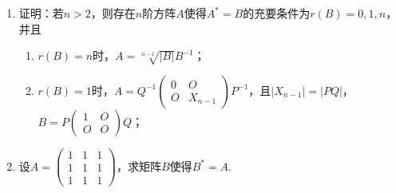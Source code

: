 \begin{enumerate}
\begin{enumerate}[label=(\arabic*)]
        \item 证明：若$n > 2$，则存在$n$阶方阵$A$使得$A^*=B$的充要条件为$r(B)=0,1,n$，并且
        \begin{enumerate}
            \item $r(B)=n$时，$A=\sqrt[n-1]{|B|}B^{-1}$；
            \item $r(B)=1$时，$A=Q^{-1}\begin{pmatrix}
                0 & O \\ O & X_{n-1}
            \end{pmatrix}P^{-1}$，且$|X_{n-1}|=|PQ|$，$B=P\begin{pmatrix}
                1 & O \\ O & O
            \end{pmatrix}Q$；
        \end{enumerate}
        \item 设$A=\begin{pmatrix}
            1 & 1 & 1 \\ 1 & 1 & 1 \\ 1 & 1 & 1
        \end{pmatrix}$，求矩阵$B$使得$B^*=A$.
    \end{enumerate}
\end{enumerate}
